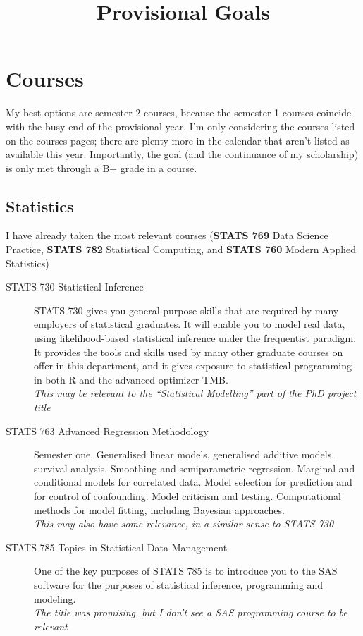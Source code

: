 \documentclass[10pt,a4paper]{article}
\begin{document}
\title{Provisional Goals}
\maketitle{}

\section{Courses}
\label{sec:courses} My best options are semester 2 courses, because
the semester 1 courses coincide with the busy end of the provisional
year. I'm only considering the courses listed on the courses pages;
there are plenty more in the calendar that aren't listed as available
this year. Importantly, the goal (and the continuance of my
scholarship) is only met through a B+ grade in a course.

\subsection{Statistics}
\label{sec:statistics}

I have already taken the most relevant courses (\textbf{STATS 769}
Data Science Practice, \textbf{STATS 782} Statistical Computing, and
\textbf{STATS 760} Modern Applied Statistics)

\begin{description}
\item[STATS 730 Statistical Inference] STATS 730 gives you
  general-purpose skills that are required by many employers of
  statistical graduates. It will enable you to model real data, using
  likelihood-based statistical inference under the frequentist paradigm.
  It provides the tools and skills used by many other graduate courses
  on offer in this department, and it gives exposure to statistical
  programming in both R and the advanced optimizer TMB.\\
  \textit{This may be relevant to the ``Statistical Modelling'' part
    of the PhD project title}
\item[STATS 763 Advanced Regression Methodology] Semester one.
  Generalised linear models, generalised additive models, survival
  analysis. Smoothing and semiparametric regression. Marginal and
  conditional models for correlated data. Model selection for prediction
  and for control of confounding. Model criticism and testing.
  Computational methods for model fitting, including Bayesian
  approaches.\\
  \textit{This may also have some relevance, in a similar sense to
    STATS 730}
\item[STATS 785 Topics in Statistical Data Management] One of the key
  purposes of STATS 785 is to introduce you to the SAS software for the
  purposes of statistical inference, programming and modeling.\\
  \textit{The title was promising, but I don't see a SAS programming
    course to be relevant}
\end{description}
\end{document}
